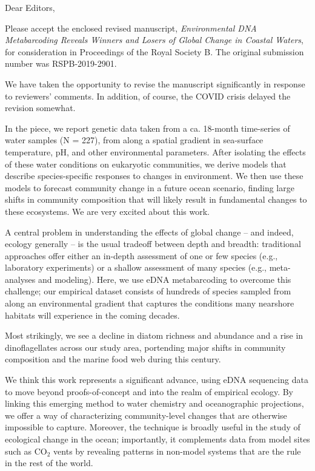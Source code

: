 \documentclass[11pt,letterpaper]{letter}
\begin{document}

\begin{letter}
{}

\opening{}

\noindent Dear Editors,
\vspace{0.05in}

Please accept the enclosed revised manuscript, \textit{Environmental DNA Metabarcoding Reveals Winners and Losers of Global Change in Coastal Waters}, for consideration in Proceedings of the Royal Society B. The original submission number was RSPB-2019-2901. 

We have taken the opportunity to revise the manuscript significantly in response to reviewers' comments. In addition, of course, the COVID crisis delayed the revision somewhat.

In the piece, we report genetic data taken from a ca. 18-month time-series of water samples (N = 227), from along a spatial gradient in sea-surface temperature, pH, and other environmental parameters. After isolating the effects of these water conditions on eukaryotic communities, we derive models that describe species-specific responses to changes in environment. We then use these models to forecast community change in a future ocean scenario, finding large shifts in community composition that will likely result in fundamental changes to these ecosystems. We are very excited about this work.

A central problem in understanding the effects of global change -- and indeed, ecology generally -- is the usual tradeoff between depth and breadth: traditional approaches offer either an in-depth assessment of one or few species (e.g., laboratory experiments) or a shallow assessment of many species (e.g., meta-analyses and modeling).  Here, we use eDNA metabarcoding to overcome this challenge; our empirical dataset consists of hundreds of species sampled from along an environmental gradient that captures the conditions many nearshore habitats will experience in the coming decades. 

Most strikingly, we see a decline in diatom richness and abundance and a rise in dinoflagellates across our study area, portending major shifts in community composition and the marine food web during this century. 

We think this work represents a significant advance, using eDNA sequencing data to move beyond proofs-of-concept and into the realm of empirical ecology. By linking this emerging method to water chemistry and oceanographic projections, we offer a way of characterizing community-level changes that are otherwise impossible to capture. Moreover, the technique is broadly useful in the study of ecological change in the ocean; importantly, it complements data from model sites such as CO$_2$ vents by revealing patterns in non-model systems that are the rule in the rest of the world. 


\end{letter}
\end{document}
